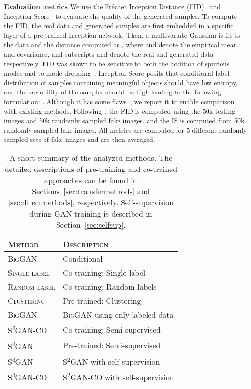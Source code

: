 \documentclass{article}
\newcommand{\cotrainSS}{\textsc{S\textsuperscript{2}GAN-CO}}
\newcommand{\cotrainSSS}{\textsc{S\textsuperscript{3}GAN-CO}}
\newcommand{\tranSS}{\textsc{S\textsuperscript{2}GAN}}
\newcommand{\tranSSS}{\textsc{S\textsuperscript{3}GAN}}
\newcommand{\tranC}{\textsc{Clustering}}
\newcommand{\slabels}{\textsc{Single label}}
\newcommand{\rlabels}{\textsc{Random label}}
\newcommand{\biggan}{\textsc{BigGAN}}
\begin{document}
\textbf{Evaluation metrics} \quad
We use the Fr{\'e}chet Inception Distance (FID)~\citep{heusel2017gans} and Inception Score~\citep{salimans2016improved} to evaluate the quality of the generated samples. To compute the FID, the real data and generated samples are first embedded in a specific layer of a pre-trained Inception network. Then, a multivariate Gaussian is fit to the data and the distance computed as
,
where  and  denote the empirical mean and covariance, and subscripts  and  denote the real and generated data respectively. FID was shown to be sensitive to both the addition of spurious modes and to mode dropping~\citep{sajjadi2018assessing,lucic2018}. Inception Score posits that conditional label distribution of samples containing meaningful objects should have low entropy, and the variability of the samples should be
high leading to the following formulation: . Although it has some flaws~\citep{barratt2018note}, we report it to enable comparison with existing methods. Following~\citet{brock2018large}, the FID is computed using the 50k \imagenet{} testing images and 50k randomly sampled fake images, and the IS is computed from 50k randomly sampled fake images. All metrics are computed for 5 different randomly sampled sets of fake images and are then averaged.

\begin{table}[t]
  \centering
  \caption{A short summary of the analyzed methods. The detailed descriptions of pre-training and co-trained approaches can be found in Sections~\ref{sec:transfermethods} and \ref{sec:directmethods}, respectively. Self-supervision during GAN training is described in Section~\ref{sec:selfsup}.\vspace{0.2cm}}
\begin{tabular}{ll}
\toprule
  \textsc{Method} & \textsc{Description} \\\midrule
  \biggan         & Conditional \citep{brock2018large} \\\midrule
  \slabels        & Co-training: Single label\\
  \rlabels        & Co-training: Random labels\\
  \tranC{}        & Pre-trained: Clustering\\\midrule
  \biggan-    & \biggan{} using only  labeled data \\
  \cotrainSS{}    & Co-training: Semi-supervised\\
  \tranSS{}       & Pre-trained: Semi-supervised\\\midrule
  \tranSSS{}      & \tranSS{} with self-supervision\\
  \cotrainSSS{}   & \cotrainSS{} with self-supervision\\
  \bottomrule
\end{tabular}
\label{tab:methods}
\end{table}
\end{document}
